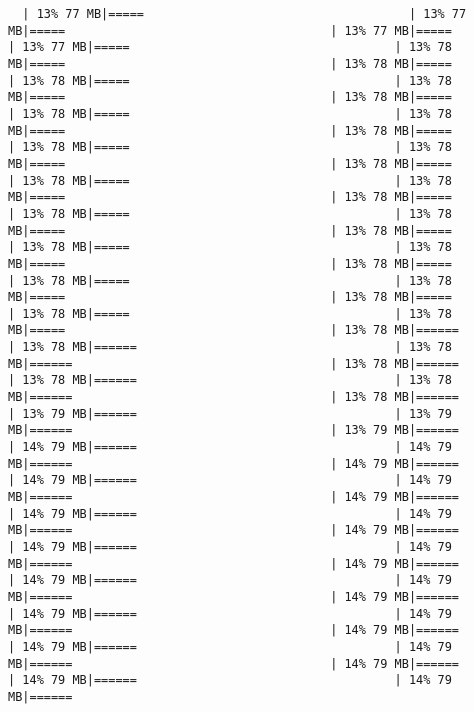\documentclass[
]{article}
\begin{document}
\begin{verbatim}
  | 13% 77 MB|=====                                     | 13% 77 MB|=====                                     | 13% 77 MB|=====                                     | 13% 77 MB|=====                                     | 13% 78 MB|=====                                     | 13% 78 MB|=====                                     | 13% 78 MB|=====                                     | 13% 78 MB|=====                                     | 13% 78 MB|=====                                     | 13% 78 MB|=====                                     | 13% 78 MB|=====                                     | 13% 78 MB|=====                                     | 13% 78 MB|=====                                     | 13% 78 MB|=====                                     | 13% 78 MB|=====                                     | 13% 78 MB|=====                                     | 13% 78 MB|=====                                     | 13% 78 MB|=====                                     | 13% 78 MB|=====                                     | 13% 78 MB|=====                                     | 13% 78 MB|=====                                     | 13% 78 MB|=====                                     | 13% 78 MB|=====                                     | 13% 78 MB|=====                                     | 13% 78 MB|=====                                     | 13% 78 MB|=====                                     | 13% 78 MB|=====                                     | 13% 78 MB|=====                                     | 13% 78 MB|=====                                     | 13% 78 MB|======                                    | 13% 78 MB|======                                    | 13% 78 MB|======                                    | 13% 78 MB|======                                    | 13% 78 MB|======                                    | 13% 78 MB|======                                    | 13% 78 MB|======                                    | 13% 79 MB|======                                    | 13% 79 MB|======                                    | 13% 79 MB|======                                    | 14% 79 MB|======                                    | 14% 79 MB|======                                    | 14% 79 MB|======                                    | 14% 79 MB|======                                    | 14% 79 MB|======                                    | 14% 79 MB|======                                    | 14% 79 MB|======                                    | 14% 79 MB|======                                    | 14% 79 MB|======                                    | 14% 79 MB|======                                    | 14% 79 MB|======                                    | 14% 79 MB|======                                    | 14% 79 MB|======                                    | 14% 79 MB|======                                    | 14% 79 MB|======                                    | 14% 79 MB|======                                    | 14% 79 MB|======                                    | 14% 79 MB|======                                    | 14% 79 MB|======                                    | 14% 79 MB|======                                    | 14% 79 MB|======                                    | 14% 79 MB|======                                    | 14% 79 MB|======     
\end{verbatim}
\end{document}
